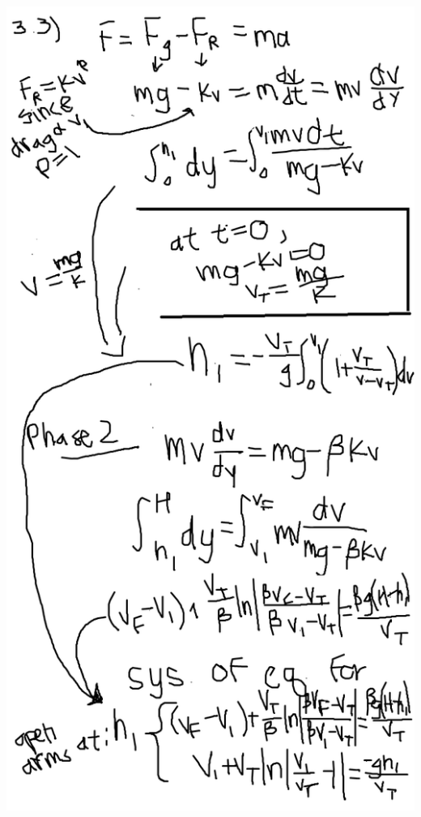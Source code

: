 \documentclass{article}
\begin{document}
\includegraphics[width=\textwidth,height=\textheight,keepaspectratio]{3-3av2.png}\newline{}
\end{document}
